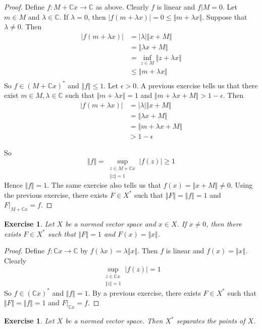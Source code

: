 \documentclass[12pt]{amsart}
\newtheorem{ex}[thm]{Exercise}
\newcommand{\lam}{\lambda}
\newcommand{\ep}{\epsilon}
\newcommand{\C}{\mathbb{C}}
\newcommand{\n}{\Vert}
\begin{document}
\begin{proof}
Define $f:M+\C x \rightarrow \C$ as above. Clearly $f$ is linear and $f|M = 0$. Let $m \in M$ and $\lam \in \C$. If $\lam = 0$, then $\vert f(m +\lam x) \vert = 0 \leq \n m+ \lam x \n$. Suppose that $\lam \neq 0$. Then 
\begin{align*}
\vert f(m+\lam x) \vert 
& = \vert \lam \vert \n x+M \n\\
& =  \n \lam x+M \n\\
& = \inf_{z \in M} \n z+ \lam x \n \\
& \leq  \n m+ \lam x  \n \\
\end{align*} 
So $f \in (M+\C x )^*$ and $\n f \n \leq 1$. Let $\ep >0$. A previous exercise tells us that there exist $m \in M, \lam \in \C$ such that $\n m+ \lam x \n = 1$ and $\n m+ \lam x +M \n > 1- \ep$. Then 
\begin{align*}
\vert f(m + \lam x) \vert
&= \vert \lam \vert \n x+M\n\\
&=\n \lam x +M \n\\
&= \n m + \lam x +M \n\\
&> 1-\ep
\end{align*}

So $$ \n f \n = \sup_{\substack{z \in M + \C x \\ \n z \n =1}} \vert f(z) \vert \geq 1$$ Hence $\n f \n =1$. 
The same exercise also tells us that $f(x) = \n x+M\n \neq 0$. Using the previous exercise, there exists $F \in X^*$ such that $\n F \n = \n f \n = 1$ and $F|_{M+\C x} = f$.
\end{proof}

\begin{ex}
Let $X$ be a normed vector space and $x \in X$. If $x \neq 0$, then there exists $F \in X^*$ such that $\n F \n = 1$ and $F(x) = \n x \n$.
\end{ex}

\begin{proof}
Define $f:\C x \rightarrow \C$ by $f(\lam x) = \lam \n x \n$. Then $f$ is linear and $f(x) = \n x \n$. Clearly $$\sup_{\substack{z \in \C x \\ \n z \n =1}}\vert f(z) \vert = 1$$ 
So $f \in (\C x)^*$ and $\n f \n = 1$. By a previous exercise, there exists $F \in X^*$ such that $\n F \n = \n f \n =1$ and $F|_{\C x} = f$. 
\end{proof}

\begin{ex}
Let $X$ be a normed vector space. Then $X^*$ separates the points of $X$. 
\end{ex}
\end{document}
